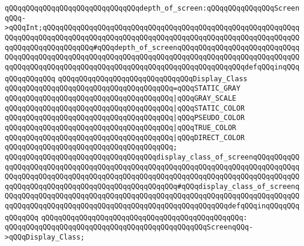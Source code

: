 \verb|qQQqqQQqqQQqqQQqqQQqqQQqqQQqqQQqdepth_of_screen:qQQqqQQqqQQqqQQqScreenqQQq->qQQqInt;qQQqqQQqqQQqqQQqqQQqqQQqqQQqqQQqqQQqqQQqqQQqqQQqqQQqqQQqqQQqqQQqqQQqqQQqqQQqqQQqqQQqqQQqqQQqqQQqqQQqqQQqqQQqqQQqqQQqqQQqqQQqqQQqqQQqqQQqqQQqqQQqqQQqqQQq#qQQqdepth_of_screenqQQqqQQqqQQqqQQqqQQqqQQqqQQqqQQqqQQqqQQqqQQqqQQqqQQqqQQqqQQqqQQqqQQqqQQqqQQqqQQqqQQqqQQqqQQqqQQqqQQqqQQqqQQqqQQqqQQqqQQqqQQqqQQqqQQqqQQqqQQqqQQqqQQqqQQqqQQqdefqQQqinqQQqqQQqqQQqqQQq|\newline
\newline
\newline
\verb|qQQqqQQqqQQqqQQqqQQqqQQqqQQqqQQqDisplay_Class|\newline
\verb|qQQqqQQqqQQqqQQqqQQqqQQqqQQqqQQqqQQqqQQq=qQQqSTATIC_GRAY|\newline
\verb|qQQqqQQqqQQqqQQqqQQqqQQqqQQqqQQqqQQqqQQq|\verb#|qQQqGRAY_SCALE#\newline
\verb|qQQqqQQqqQQqqQQqqQQqqQQqqQQqqQQqqQQqqQQq|\verb#|qQQqSTATIC_COLOR#\newline
\verb|qQQqqQQqqQQqqQQqqQQqqQQqqQQqqQQqqQQqqQQq|\verb#|qQQqPSEUDO_COLOR#\newline
\verb|qQQqqQQqqQQqqQQqqQQqqQQqqQQqqQQqqQQqqQQq|\verb#|qQQqTRUE_COLOR#\newline
\verb|qQQqqQQqqQQqqQQqqQQqqQQqqQQqqQQqqQQqqQQq|\verb#|qQQqDIRECT_COLOR#\newline
\verb|qQQqqQQqqQQqqQQqqQQqqQQqqQQqqQQqqQQqqQQq;|\newline
\newline
\verb|qQQqqQQqqQQqqQQqqQQqqQQqqQQqqQQqqQQqdisplay_class_of_screenqQQqqQQqqQQqqQQqqQQqqQQqqQQqqQQqqQQqqQQqqQQqqQQqqQQqqQQqqQQqqQQqqQQqqQQqqQQqqQQqqQQqqQQqqQQqqQQqqQQqqQQqqQQqqQQqqQQqqQQqqQQqqQQqqQQqqQQqqQQqqQQqqQQqqQQqqQQqqQQqqQQqqQQqqQQqqQQqqQQqqQQqqQQqqQQq#qQQqdisplay_class_of_screenqQQqqQQqqQQqqQQqqQQqqQQqqQQqqQQqqQQqqQQqqQQqqQQqqQQqqQQqqQQqqQQqqQQqqQQqqQQqqQQqqQQqqQQqqQQqqQQqqQQqqQQqqQQqqQQqqQQqqQQqqQQqdefqQQqinqQQqqQQqqQQqqQQq|\newline
\verb|qQQqqQQqqQQqqQQqqQQqqQQqqQQqqQQqqQQqqQQqqQQqqQQq:|\newline
\verb|qQQqqQQqqQQqqQQqqQQqqQQqqQQqqQQqqQQqqQQqqQQqqQQqScreenqQQq->qQQqDisplay_Class;|\newline
\newline
\newline
